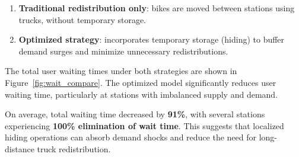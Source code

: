 \documentclass[11pt,a4paper]{article}
\begin{document}
\begin{enumerate}
    \item \textbf{Traditional redistribution only}: bikes are moved between stations using trucks, without temporary storage.
    \item \textbf{Optimized strategy}: incorporates temporary storage (hiding) to buffer demand surges and minimize unnecessary redistributions.
\end{enumerate}

The total user waiting times under both strategies are shown in Figure~\ref{fig:wait_compare}. The optimized model significantly reduces user waiting time, particularly at stations with imbalanced supply and demand.

On average, total waiting time decreased by \textbf{91\%}, with several stations experiencing \textbf{100\% elimination of wait time}. This suggests that localized hiding operations can absorb demand shocks and reduce the need for long-distance truck redistribution.
\end{document}
